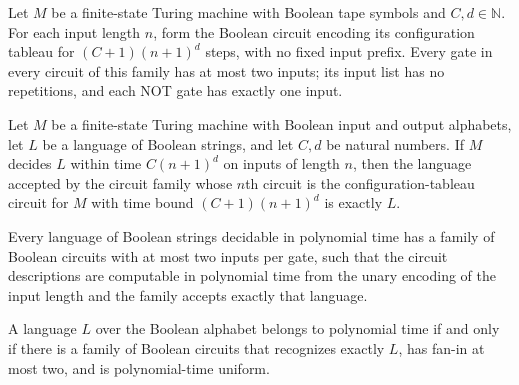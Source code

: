 \begin{theorem}
\label{Complexity.tabFamily_hasFaninTwo}
\leanok
{}
Let $M$ be a finite-state Turing machine with Boolean tape symbols and
$C,d\in\mathbb{N}$. For each input length $n$, form the Boolean circuit encoding its
configuration tableau for $(C+1)(n+1)^d$ steps, with no fixed input prefix. Every gate
in every circuit of this family has at most two inputs; its input list has no
repetitions, and each NOT gate has exactly one input.
\end{theorem}

\begin{theorem}
\label{Complexity.tabFamily_language}
\leanok
{}
Let $M$ be a finite-state Turing machine with Boolean input and output alphabets, let
$L$ be a language of Boolean strings, and let $C,d$ be natural numbers. If $M$ decides
$L$ within time $C(n+1)^d$ on inputs of length $n$, then the language accepted by the
circuit family whose $n$th circuit is the configuration-tableau circuit for $M$ with
time bound $(C+1)(n+1)^d$ is exactly $L$.
\end{theorem}

\begin{theorem}
\label{Language.exists_isPUniform_of_mem_P}
\leanok
{}
Every language of Boolean strings decidable in polynomial time has a family of Boolean
circuits with at most two inputs per gate, such that the circuit descriptions are
computable in polynomial time from the unary encoding of the input length and the family
accepts exactly that language.
\end{theorem}

\begin{theorem}
\label{Language.mem_P_iff_exists_isPUniform}
\leanok
{}
A language $L$ over the Boolean alphabet belongs to polynomial time if and only if there
is a family of Boolean circuits that recognizes exactly $L$, has fan-in at most two, and
is polynomial-time uniform.
\end{theorem}
